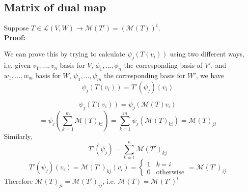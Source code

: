 \documentclass{article}
\begin{document}
\subsection{Matrix of dual map}
Suppose $T \in \mathcal{L}(V, W) \rightarrow \mathcal{M}(T') = (\mathcal{M}(T))^t$.\\
\textbf{Proof:}
\begin{addmargin}[1em]{0em}
We can prove this by trying to calculate $\psi_j(T(v_i))$ using two different ways, i.e. given $v_1, ..., v_n$ basis for $V$, $\phi_1, ..., \phi_n$ the corresponding basis of $V'$, and $w_1, ..., w_m$ basis for $W$, $\psi_1, ..., \psi_m$ the corresponding basis for $W'$, we have
\begin{equation*}
    \psi_j(T(v_i)) = T'(\psi_j)(v_i)
\end{equation*}
\end{addmargin}
\begin{equation*}
    \psi_j(T(v_i)) = \psi_j(\mathcal{M}(T)v_i)
\end{equation*}
\begin{equation*}
    = \psi_j\left(
    \sum_{k=1}^{m} \mathcal{M}(T)_{ki}
    \right) = \sum_{k=1}^{m} \psi_j(\mathcal{M}(T)_{ki}) = \mathcal{M}(T)_{ji}
\end{equation*}
Similarly,
\begin{equation*}
    T'(\psi_j) = \sum_{k = 1}^{n} \mathcal{M}(T')_{kj}
\end{equation*}
\begin{equation*}
    T'(\psi_j)(v_i) = \mathcal{M}(T')_{kj}(v_i) = \begin{cases}
    1 & k = i\\
    0 & \textrm{otherwise}
    \end{cases} = \mathcal{M}(T')_{ij}
\end{equation*}
Therefore $\mathcal{M}(T)_{ji} = \mathcal{M}(T')_{ij}$, i.e. $\mathcal{M}(T) = \mathcal{M}(T')^t$
\end{document}
